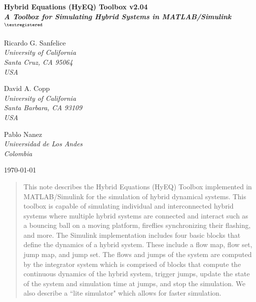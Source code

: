 \documentclass{article}
\newcounter{chapter}
\newcommand{\chapter}[1]{{\LARGE \center \bf #1 \\ \vspace{0.5in} }}
\newcommand{\HyEQversion}{\mbox{v2.04}}
\begin{document}
\chapter{Hybrid Equations (HyEQ) Toolbox \HyEQversion\\
{\it A Toolbox for Simulating Hybrid Systems in MATLAB/Simulink$^{{\footnotesize\textregistered}}$}
}
\label{app:simulations}

\vspace{-0.4in}

\begin{minipage}[t]{1.05\textwidth}
\begin{minipage}[t]{0.3\textwidth}
\begin{center}
Ricardo G. Sanfelice\\%
{\it University of California \\ Santa Cruz, CA 95064}\\
{\it USA}
\end{center}
\end{minipage}
\begin{minipage}[t]{0.3\textwidth}
\begin{center}
David A. Copp\\%
{\it University of California \\ Santa Barbara, CA 93109}\\
{\it USA}
\end{center}
\end{minipage}
\begin{minipage}[t]{0.3\textwidth}
\begin{center}
Pablo Nanez\\%
{\it Universidad de Los Andes}\\
{\it Colombia}
\end{center}
\end{minipage}
\end{minipage}

\begin{center}
{\today}
\end{center}


\begin{abstract}
This note describes the Hybrid Equations (HyEQ) Toolbox implemented in MATLAB/Simulink for the simulation of hybrid dynamical systems. This toolbox is capable of simulating individual and interconnected hybrid systems where multiple hybrid systems are connected and interact such as a bouncing ball on a moving platform, fireflies synchronizing their flashing, and more. The Simulink implementation includes four basic blocks that define the dynamics of a hybrid system. These include a flow map, flow set, jump map, and jump set. The flows and jumps of the system are computed by the integrator system which is comprised of blocks that compute the continuous dynamics of the hybrid system, trigger jumps, update the state of the system and simulation time at jumps, and stop the simulation. We also describe a ``lite simulator" which allows for faster simulation.
\end{abstract}
\end{document}
